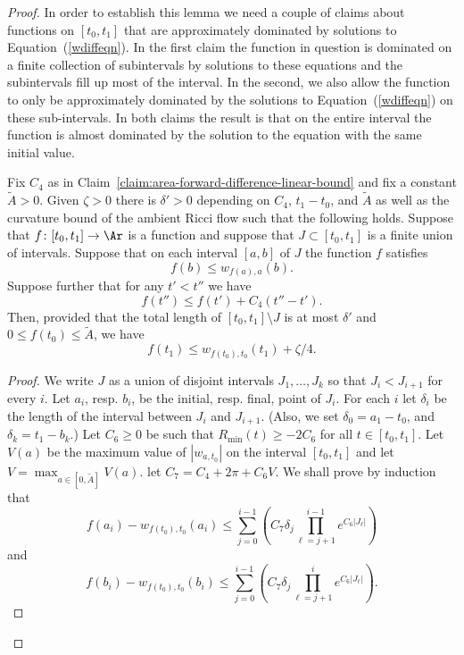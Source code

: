 \begin{proof}
In order to establish this lemma  we need a couple of claims about
functions on $[t_0,t_1]$ that are approximately dominated by
solutions to Equation~(\ref{wdiffeqn}). In the first claim the
function in question is dominated on a finite collection of
subintervals by solutions to these equations and the subintervals
fill up most of the interval. In the second, we also allow the
function to only be approximately dominated by the solutions to
Equation~(\ref{wdiffeqn}) on these sub-intervals. In both claims the
result is that on the entire interval the function is almost
dominated by the solution to the equation with the same initial
value.


\begin{claim}
\label{claim:piecewise-domination-estimate}
\label{C1C4delta}
Fix $C_4$ as in Claim~\ref{claim:area-forward-difference-linear-bound} and fix a constant
$\widetilde A>0$. Given $\zeta>0$ there is $\delta'>0$ depending on
$C_4$, $t_1-t_0$, and $\widetilde A$ as well as the curvature bound
of the ambient Ricci flow such that the following holds. Suppose
that $f\colon [t_0,t_1]\to \Ar$ is a function and suppose that
$J\subset [t_0,t_1]$ is a finite union of intervals. Suppose that on
each interval $[a,b]$ of $J$ the function $f$ satisfies
$$f(b)\le w_{f(a),a}(b).$$ Suppose further that for any $t'<t''$ we
have
$$f(t'')\le f(t')+C_4(t''-t').$$
Then, provided that the total length of $[t_0,t_1]\setminus J$ is at
most $\delta'$ and $0\le f(t_0)\le \widetilde A$, we have
$$f(t_1)\le w_{f(t_0),t_0}(t_1)+\zeta/4.$$
\end{claim}

\begin{proof}
We write $J$ as a union of disjoint intervals $J_1,\ldots,J_k$ so
that  $J_i<J_{i+1}$ for every $i$. Let $a_i$, resp. $b_i$, be the
initial, resp. final, point of $J_i$. For each $i$ let $\delta_i$ be
the length of the interval between $J_i$ and $J_{i+1}$. (Also, we
set $\delta_0=a_1-t_0$, and $\delta_{k}=t_1-b_k$.) Let $C_6\ge 0$ be
such that $R_{\min}(t)\ge -2C_6$ for all $t\in [t_0,t_1]$. Let
$V(a)$ be the maximum value of $|w_{a,t_0}|$ on the interval
$[t_0,t_1]$ and let $V=\max_{a\in [0,\widetilde A]}V(a)$. let
$C_7=C_4+2\pi+C_6V$.
 We shall prove by
induction that
$$f(a_i)-w_{f(t_0),t_0}(a_i)\le \sum_{j=0}^{i-1}\left(C_7\delta_j
\prod_{\ell=j+1}^{i-1}e^{C_6|J_\ell|}\right)$$ and
$$f(b_i)-w_{f(t_0),t_0}(b_i)\le
\sum_{j=0}^{i-1}\left(C_7\delta_j\prod_{\ell=j+1}^ie^{
C_6|J_\ell|}\right).$$


\end{proof}
\end{proof}
